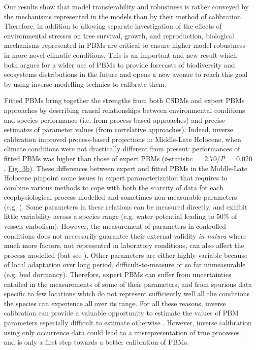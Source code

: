 \documentclass[pdflatex, sn-nature]{sn-jnl}%
\begin{document}
Our results show that model transferability and robustness is rather conveyed by the mechanisms represented in the models than by their method of calibration. Therefore, in addition to allowing separate investigation of the effects of environmental stresses on tree survival, growth, and reproduction, biological mechanisms represented in PBMs are critical to ensure higher model robustness in more novel climatic conditions. This is an important and new result which both argues for a wider use of PBMs to provide forecasts of biodiversity and ecosystems distributions in the future and opens a new avenue  to reach this goal by using inverse modelling technics to calibrate them.

Fitted PBMs bring together the strengths from both CSDMs and expert PBMs approaches by describing causal relationships between environmental conditions and species performance (i.e. from process-based approaches) and precise estimates of parameter values (from correlative approaches). Indeed, inverse calibration improved process-based projections in Middle-Late Holocene, when climate conditions were not  drastically different from present: performances of fitted PBMs was higher than those of expert PBMs (\emph{t}-statistic $=2.70$/\emph{P} $=0.020$, \hyperref[past_performance]{Fig. 3b}). These differences between expert and fitted PBMs in the Middle-Late Holocene pinpoint some issues in expert parameterization that requires to combine various methods to cope with both the scarcity of data for each ecophysiological process modelled and sometimes non-measurable parameters (e.g. \citep{DeCaceres2023}).  Some parameters in these relations can be measured directly, and exhibit little variability across a species range (e.g. water potential leading to 50\% of vessels embolism). However, the measurement of parameters in controlled conditions does not necessarily guarantee their external validity \emph{in natura} \cite{Asse2020} where much more factors, not represented in laboratory conditions, can also affect the process modelled (but see \cite{Satake2013}). Other parameters are either highly variable because of local adaptation over long period,  difficult-to-measure or so far unmeasurable (e.g. bud dormancy). Therefore, expert PBMs can suffer from uncertainties entailed in the measurements of some of their parameters, and from spurious data specific to few locations which do not represent sufficiently well all the conditions the species can experience all over its range. For all these reasons, inverse calibration can provide a valuable opportunity to estimate the values of PBM parameters especially difficult to estimate otherwise \cite{Evans2016, Hartig2014}. However, inverse calibration using only occurrence data could lead to a misrepresentation of true processes \cite{VanderMeersch2023}, and is only a first step towards a better calibration of PBMs. 
\end{document}
